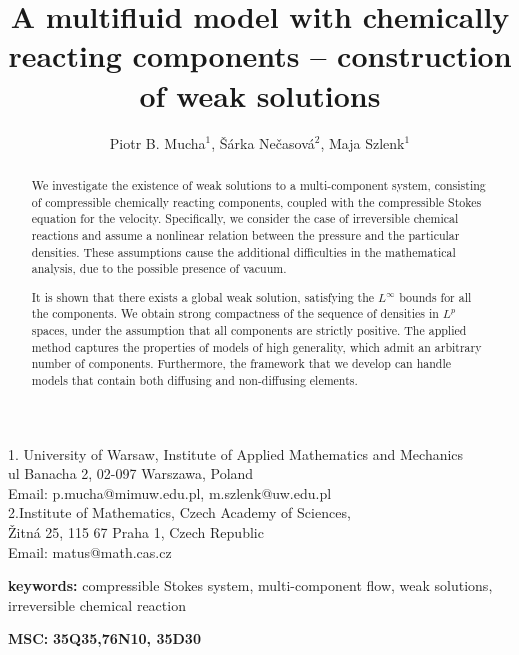 \documentclass[11pt]{article}
\title{A multifluid model with chemically reacting components -- construction of weak solutions}
\author{Piotr B. Mucha$^1$, \v{S}\'{a}rka Ne\v{c}asov\'{a}$^2$, Maja Szlenk$^1$}
\date{}
\numberwithin{equation}{section}
\numberwithin{tw}{section}
\begin{document}
\maketitle

\begin{center}
1. University of Warsaw, Institute of Applied Mathematics and Mechanics \\
ul Banacha 2, 02-097 Warszawa, Poland \\
Email: p.mucha@mimuw.edu.pl, m.szlenk@uw.edu.pl\\
2.Institute of Mathematics, Czech Academy of Sciences, \\
\v Zitn\'a 25, 115 67 Praha 1, Czech Republic\\
Email: matus@math.cas.cz

\end{center}


\begin{abstract}
   We investigate the existence of weak solutions to a multi-component system, consisting of compressible chemically reacting components, coupled with the  compressible Stokes equation for the velocity. Specifically, we consider the case of irreversible chemical reactions and assume a nonlinear relation between the pressure and the particular densities. These assumptions cause the additional difficulties in the mathematical analysis, due to the possible presence of vacuum.  
   
   It is shown that there exists a global weak solution, satisfying the $L^\infty$ bounds for all the components. We obtain strong compactness of the sequence of densities in $L^p$ spaces, under the assumption that all components are strictly positive. The applied method captures the properties of models of high generality, which admit an arbitrary number of components. Furthermore, the framework that we develop can handle models that contain both diffusing and non-diffusing elements.
\end{abstract}

\noindent
\textbf{keywords:} compressible Stokes system, multi-component flow, weak solutions, irreversible chemical reaction

\noindent
\textbf{MSC:} {\bf 35Q35,76N10, 35D30}
\end{document}
